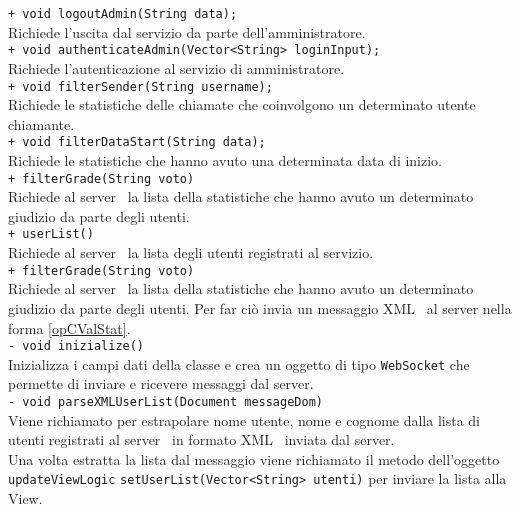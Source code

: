 {{\begin{sloppypar}
{{\begin{itemize}
{						\texttt{+ void logoutAdmin(String data);}\\
						Richiede l'uscita dal servizio da parte dell'amministratore.\\
						
						\texttt{+ void authenticateAdmin(Vector<String> loginInput);}\\
						Richiede l'autenticazione al servizio di amministratore.\\
						
						\texttt{+ void filterSender(String username);}\\
						Richiede le statistiche delle chiamate che coinvolgono un determinato utente chiamante.\\
						
						\texttt{+ void filterDataStart(String data);}\\
						Richiede le statistiche che hanno avuto una determinata data di inizio.\\
						
						\texttt{+ filterGrade(String voto)}\\
						Richiede al server\g~ la lista della statistiche che hanno avuto un determinato giudizio da parte degli utenti.\\
						
						\texttt{+ userList()}\\
						Richiede al server\g~ la lista degli utenti registrati al servizio.\\
						
						\texttt{+ filterGrade(String voto)}\\
						Richiede al server\g~ la lista della statistiche che hanno avuto un determinato giudizio da parte degli utenti. Per far ciò invia un messaggio XML\g~ al server nella forma \ref{opCValStat}.\\
						
						\texttt{- void inizialize()}\\
						Inizializza i campi dati della classe e crea un oggetto di tipo \texttt{WebSocket} che permette di inviare e ricevere messaggi dal server\g.\\
						
						\texttt{- void parseXMLUserList(Document messageDom)}\\
						Viene richiamato per estrapolare nome utente, nome e cognome dalla lista di utenti registrati al server\g~ in formato XML\g~ inviata dal server\g.\\
						Una volta estratta la lista dal messaggio viene richiamato il metodo dell'oggetto \texttt{updateViewLogic} \texttt{setUserList(Vector<String> utenti)} per inviare la lista alla View.\\
						
}
\end{itemize}}}
\end{sloppypar}}}

